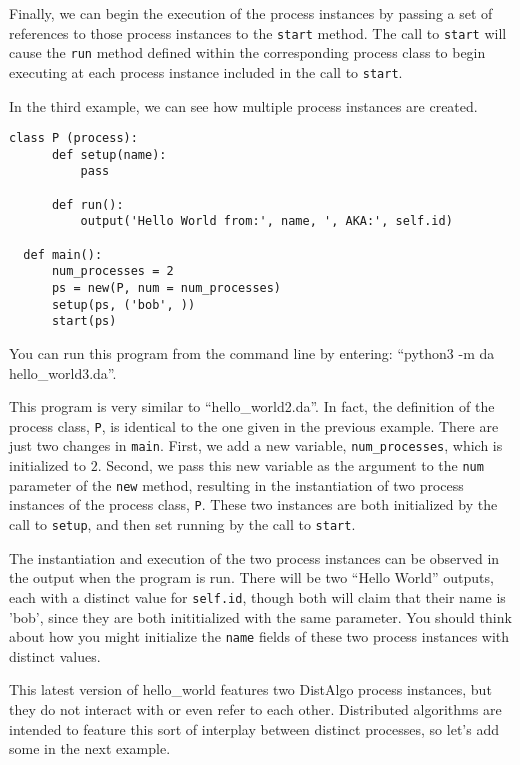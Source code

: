 \documentclass[11pt]{article}
\begin{document}
Finally, we can begin the execution of the process instances by passing a set
of references to those process instances to the \texttt{start} method. The call
to \texttt{start} will cause the \texttt{run} method defined within the
corresponding process class to begin executing at each process instance
included in the call to \texttt{start}.

In the third example, we can see how multiple process instances are created.

\begin{lstlisting}[caption={hello\_world03.da - Multiple Process Instances}, label={lst:hw03}]
  class P (process):
      def setup(name):
          pass

      def run():
          output('Hello World from:', name, ', AKA:', self.id)

  def main():
      num_processes = 2
      ps = new(P, num = num_processes)
      setup(ps, ('bob', ))
      start(ps)

\end{lstlisting}

\noindent You can run this program from the command line by entering:
``python3 -m da hello\_world3.da''.

This program is very similar to ``hello\_world2.da''. In fact, the definition of
the process class, \texttt{P}, is identical to the one given in the previous
example. There are just two changes in \texttt{main}. First, we add a new
variable, \texttt{num\_processes}, which is initialized to $2$. Second, we pass
this new variable as the argument to the \texttt{num} parameter of the
\texttt{new} method, resulting in the instantiation of two process instances of
the process class, \texttt{P}. These two instances are both initialized by the
call to \texttt{setup}, and then set running by the call to \texttt{start}.

The instantiation and execution of the two process instances can be observed in
the output when the program is run. There will be two ``Hello World'' outputs,
each with a distinct value for \texttt{self.id}, though both will claim that
their name is 'bob', since they are both inititialized with the same parameter.
You should think about how you might initialize the \texttt{name} fields of
these two process instances with distinct values.

This latest version of hello\_world features two DistAlgo process instances,
but they do not interact with or even refer to each other. Distributed
algorithms are intended to feature this sort of interplay between distinct
processes, so let's add some in the next example.
\end{document}
